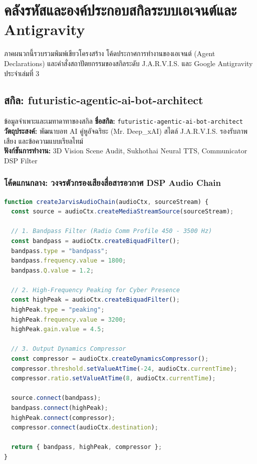 \chapter{คลังรหัสและองค์ประกอบสกิลระบบเอเจนต์และ Antigravity}

ภาคผนวกนี้รวบรวมพิมพ์เขียวโครงสร้าง โค้ดประกาศการทำงานของเอเจนต์ (Agent Declarations) และคำสั่งสถาปัตยกรรมของสกิลระดับ J.A.R.V.I.S. และ Google Antigravity ประจำเล่มที่ 3

\section{สกิล: futuristic-agentic-ai-bot-architect}

\begin{teachingplan}{ข้อมูลจำเพาะและเมทาดาทาของสกิล}
\textbf{ชื่อสกิล:} \texttt{futuristic-agentic-ai-bot-architect}\\
\textbf{วัตถุประสงค์:} พัฒนาบอท AI คู่หูอัจฉริยะ (Mr. Deep\_xAI) สไตล์ J.A.R.V.I.S. รองรับภาพ เสียง และข้อความแบบเรียลไทม์\\
\textbf{ฟังก์ชันการทำงาน:} 3D Vision Scene Audit, Sukhothai Neural TTS, Communicator DSP Filter
\end{teachingplan}

\subsection{โค้ดแกนกลาง: วงจรตัวกรองเสียงสื่อสารอวกาศ DSP Audio Chain}

\begin{lstlisting}[language=JavaScript, caption={Web Audio API Communicator DSP Filter}]
function createJarvisAudioChain(audioCtx, sourceStream) {
  const source = audioCtx.createMediaStreamSource(sourceStream);
  
  // 1. Bandpass Filter (Radio Comm Profile 450 - 3500 Hz)
  const bandpass = audioCtx.createBiquadFilter();
  bandpass.type = "bandpass";
  bandpass.frequency.value = 1800;
  bandpass.Q.value = 1.2;
  
  // 2. High-Frequency Peaking for Cyber Presence
  const highPeak = audioCtx.createBiquadFilter();
  highPeak.type = "peaking";
  highPeak.frequency.value = 3200;
  highPeak.gain.value = 4.5;
  
  // 3. Output Dynamics Compressor
  const compressor = audioCtx.createDynamicsCompressor();
  compressor.threshold.setValueAtTime(-24, audioCtx.currentTime);
  compressor.ratio.setValueAtTime(8, audioCtx.currentTime);

  source.connect(bandpass);
  bandpass.connect(highPeak);
  highPeak.connect(compressor);
  compressor.connect(audioCtx.destination);
  
  return { bandpass, highPeak, compressor };
}
\end{lstlisting}

